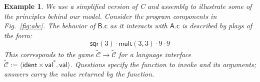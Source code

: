 \documentclass[draft,11pt]{report}
\newtheorem{example}{Example}
\newcommand{\kw}[1]{\ensuremath{ \mathsf{#1} }}
\begin{document}
\begin{example} \label{ex:abc} %
We use a simplified version of C and assembly
to illustrate some of the principles behind our model.
Consider the program components in Fig.~\ref{fig:abc}.
The behavior of $\textsf{B.c}$
as it interacts with $\textsf{A.c}$
is described by plays of the form:
\begin{equation} \label{eqn:cplay}
  \mathsf{sqr}(3) \cdot
    \underline{\mathsf{mult}(3,3)} \cdot 9 \cdot \underline{9}
\end{equation}
This corresponds to the game
$\tilde{\mathcal{C}} \rightarrow \tilde{\mathcal{C}}$
for a language interface
$\tilde{\mathcal{C}} :=
 \langle \kw{ident} \times \kw{val}^*, \kw{val} \rangle$.
Questions specify the function to invoke
and its arguments;
answers carry the value returned by the function.


\end{example}
\end{document}
